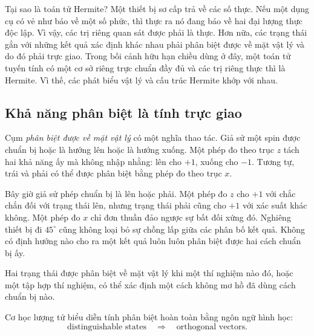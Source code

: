 Tại sao là toán tử Hermite? Một thiết bị sơ cấp trả về các số thực. Nếu một dụng cụ có vẻ như báo về một số phức, thì thực ra nó đang báo về hai đại lượng thực độc lập. Vì vậy, các trị riêng quan sát được phải là thực. Hơn nữa, các trạng thái gắn với những kết quả xác định khác nhau phải phân biệt được về mặt vật lý và do đó phải trực giao. Trong bối cảnh hữu hạn chiều dùng ở đây, một toán tử tuyến tính có một cơ sở riêng trực chuẩn đầy đủ và các trị riêng thực thì là Hermite. Vì thế, các phát biểu vật lý và cấu trúc Hermite khớp với nhau.

\subsection{Khả năng phân biệt là tính trực giao}

Cụm \emph{phân biệt được về mặt vật lý} có một nghĩa thao tác. Giả sử một spin được chuẩn bị hoặc là hướng lên hoặc là hướng xuống. Một phép đo theo trục \(z\) tách hai khả năng ấy mà không nhập nhằng: lên cho \(+1\), xuống cho \(-1\). Tương tự, trái và phải có thể được phân biệt bằng phép đo theo trục \(x\).

Bây giờ giả sử phép chuẩn bị là lên hoặc phải. Một phép đo \(z\) cho \(+1\) với chắc chắn đối với trạng thái lên, nhưng trạng thái phải cũng cho \(+1\) với xác suất khác không. Một phép đo \(x\) chỉ đơn thuần đảo ngược sự bất đối xứng đó. Nghiêng thiết bị đi \(45^\circ\) cũng không loại bỏ sự chồng lấp giữa các phân bố kết quả. Không có định hướng nào cho ra một kết quả luôn luôn phân biệt được hai cách chuẩn bị ấy.

\begin{definition}
Hai trạng thái được phân biệt về mặt vật lý khi một thí nghiệm nào đó, hoặc một tập hợp thí nghiệm, có thể xác định một cách không mơ hồ đã dùng cách chuẩn bị nào.
\end{definition}

Cơ học lượng tử biểu diễn tính phân biệt hoàn toàn bằng ngôn ngữ hình học:
\begin{equation}
\text{distinguishable states}
\quad\Longrightarrow\quad
\text{orthogonal vectors}.
\end{equation}

\begin{classroomqa}
\end{classroomqa}

